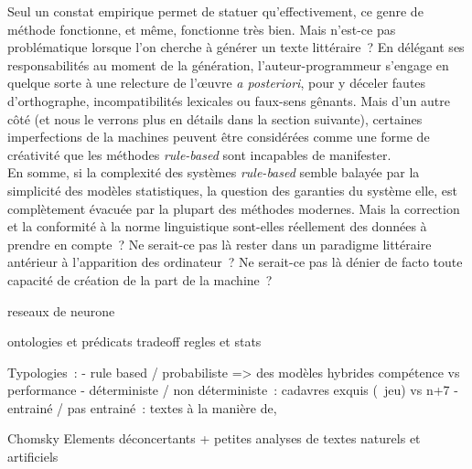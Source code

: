 \documentclass{article}
\begin{document}
			Seul un constat empirique permet de statuer qu'effectivement, ce genre de méthode fonctionne, et même, fonctionne très bien. Mais n'est-ce pas problématique lorsque l'on cherche à générer un texte littéraire~? En délégant ses responsabilités au moment de la génération, l'auteur-programmeur s'engage en quelque sorte à une relecture de l'œuvre \textit{a posteriori}, pour y déceler fautes d'orthographe, incompatibilités lexicales ou faux-sens gênants. Mais d'un autre côté (et nous le verrons plus en détails dans la section suivante), certaines imperfections de la machines peuvent être considérées comme une forme de créativité que les méthodes \textit{rule-based} sont incapables de manifester.\\
			
			En somme, si la complexité des systèmes \textit{rule-based} semble balayée par la simplicité des modèles statistiques, la question des garanties du système elle, est complètement évacuée par la plupart des méthodes modernes. Mais la correction et la conformité à la norme linguistique sont-elles réellement des données à prendre en compte~? Ne serait-ce pas là rester dans un paradigme littéraire antérieur à l'apparition des ordinateur~? Ne serait-ce pas là dénier de facto toute capacité de création de la part de la machine~?
			
			reseaux de neurone
				
			ontologies et prédicats		
		tradeoff regles et stats
		
		
		Typologies~:
		- rule based / probabiliste => des modèles hybrides compétence vs performance
		- déterministe / non déterministe~: cadavres exquis (~jeu) vs n+7
		- entrainé / pas entrainé~: textes à la manière de, 
		
		Chomsky
		Elements déconcertants + petites analyses de textes naturels et artificiels
\end{document}
